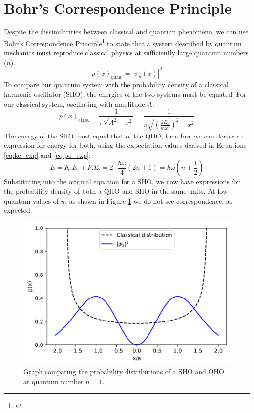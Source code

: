 \documentclass[a4paper]{article}
\begin{document}
\section{Bohr's Correspondence Principle} \label{section:bohr}
Despite the dissimilarities between classical and quantum phenomena, we can use Bohr's Correspondence Principle\footnote{\cite{1605.08202}} to state that a system described by quantum mechanics must reproduce classical physics at sufficiently large quantum numbers ($n$). 
\begin{equation}
p(x)_\text{quan.}=|\psi_n(x)|^2
\end{equation}
To compare our quantum system with the probability density of a classical harmonic oscillator (SHO), the energies of the two systems must be equated. For our classical system, oscillating with amplitude $A$:
\begin{equation}
p(x)_\text{class.}=\frac1{\pi\sqrt{A^2-x^2}}=\frac1{\pi\sqrt{(\frac{2E_n}{m\omega^2})^2-x^2}}
\end{equation}
The energy of the SHO must equal that of the QHO, therefore we can derive an expression for energy for both, using the expectation values derived in Equations \ref{eq:ke_exp} and \ref{eq:pe_exp}:
\begin{equation}
E=K.E.+P.E.=2\cdot\frac{\hbar\omega}4(2n+1)=\hbar\omega(n+\frac12)
\end{equation}
Substituting into the original equation for a SHO, we now have expressions for the probability density of both a QHO and SHO in the same units. At low quantum values of $n$, as shown in Figure \ref{fig:n1} we do not see correspondence, as expected.
\begin{figure}[h!]
  \centerline{\includegraphics[scale=0.7]{n1.png}}
  \caption{Graph comparing the probability distributions of a SHO and QHO at quantum number $n=1$.}
  \label{fig:n1}
\end{figure}
\end{document}
